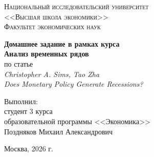\begin{titlepage}
\begin{center}
\textsc{Национальный исследовательский университет\\
<<Высшая школа экономики>>\\[3mm]
Факультет экономических наук}

\vfill

{\large \textbf{Домашнее задание в рамках курса}}\\[3mm]
{\Large \textbf{Анализ временных рядов}}\\[8mm]

{\normalsize по статье}\\[2mm]
{\large \textit{Christopher A. Sims, Tao Zha}}\\[1mm]
{\large \textit{Does Monetary Policy Generate Recessions?}}

\vfill
\end{center}

\begin{flushright}
\begin{minipage}{0.55\textwidth}
\raggedleft
Выполнил:\\[2mm]
студент 3 курса\\
образовательной программы <<Экономика>>\\
Поздняков Михаил Александрович
\end{minipage}
\end{flushright}

\vfill

\begin{center}
Москва, 2026 г.
\end{center}
\end{titlepage}